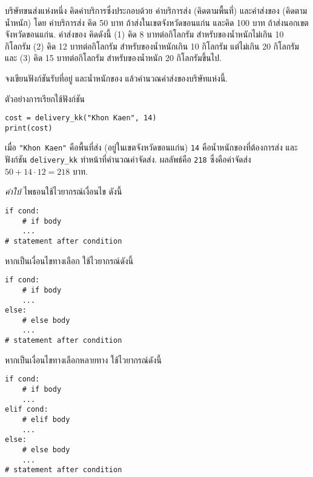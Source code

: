 \begin{Exercise}
	\label{prog: conditions delivery}
บริษัทขนส่งแห่งหนึ่ง 
คิดค่าบริการซึ่งประกอบด้วย
ค่าบริการส่ง (คิดตามพื้นที่)
และค่าส่งของ (คิดตามน้ำหนัก)
โดย
ค่าบริการส่ง
คิด 50 บาท ถ้าส่งในเขตจังหวัดขอนแก่น
และคิด 100 บาท ถ้าส่งนอกเขตจังหวัดขอนแก่น.
ค่าส่งของ คิดดังนี้
(1) คิด 8 บาทต่อกิโลกรัม สำหรับของน้ำหนักไม่เกิน 10 กิโลกรัม
(2) คิด 12 บาทต่อกิโลกรัม สำหรับของน้ำหนักเกิน 10 กิโลกรัม แต่ไม่เกิน 20 กิโลกรัม
และ (3) คิด 15 บาทต่อกิโลกรัม สำหรับของน้ำหนัก 20 กิโลกรัมขึ้นไป.

จงเขียนฟังก์ชันรับที่อยู่ และน้ำหนักของ แล้วคำนวณค่าส่งของบริษัทแห่งนี้.

ตัวอย่างการเรียกใช้ฟังก์ชัน
\begin{verbatim}
cost = delivery_kk("Khon Kaen", 14)
print(cost)
\end{verbatim}
เมื่อ \verb|"Khon Kaen"| คือพื้นที่ส่ง (อยู่ในเขตจังหวัดขอนแก่น)
\verb|14| คือน้ำหนักของที่ต้องการส่ง
และฟังก์ชัน \verb|delivery_kk| ทำหน้าที่คำนวณค่าจัดส่ง.
ผลลัพธ์คือ
\verb|218| ซึ่งคือค่าจัดส่ง $50 + 14 \cdot 12 = 218$ บาท.

\textit{คำใบ้} ไพธอนใช้ไวยากรณ์เงื่อนไข ดังนี้
\begin{verbatim}
if cond:
    # if body
    ...
# statement after condition
\end{verbatim}

หากเป็นเงื่อนไขทางเลือก ใช้ไวยากรณ์ดังนี้
\begin{verbatim}
if cond:
    # if body
    ...
else:
    # else body
    ...
# statement after condition
\end{verbatim}

หากเป็นเงื่อนไขทางเลือกหลายทาง ใช้ไวยากรณ์ดังนี้
\begin{verbatim}
if cond:
    # if body
    ...
elif cond:
    # elif body
    ...
else:
    # else body
    ...
# statement after condition
\end{verbatim}


\end{Exercise}

